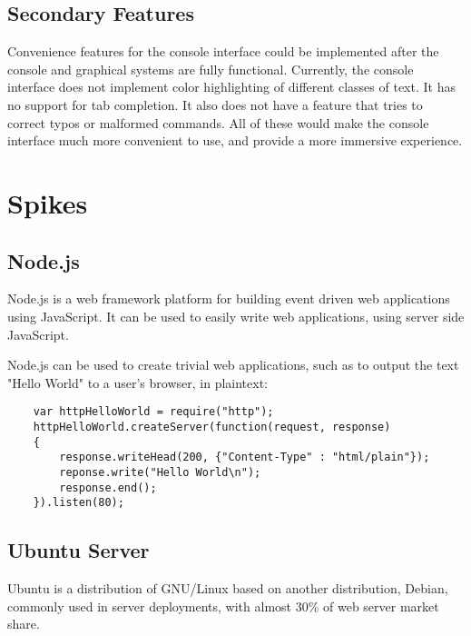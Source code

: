 \documentclass[12pt, letterpaper]{report}
\begin{document}
	\section{Secondary Features}
	Convenience features for the console interface could be implemented after the console and graphical systems are fully functional. Currently, the console interface does not implement color highlighting of different classes of text. It has no support for tab completion. It also does not have a feature that tries to correct typos or malformed commands. All of these would make the console interface much more convenient to use, and provide a more immersive experience.
	
	
	\chapter{Spikes}
	\section{Node.js}
	

	
	\par
	Node.js is a web framework platform for building event driven web applications using JavaScript. It can be used to easily write web applications, using server side JavaScript.
    	
	\par
    Node.js can be used to create trivial web applications, such as to output the text "Hello World" to a user's browser, in plaintext:
    
    \begin{lstlisting}
    var httpHelloWorld = require("http");
    httpHelloWorld.createServer(function(request, response)
    {
        response.writeHead(200, {"Content-Type" : "html/plain"});
        reponse.write("Hello World\n");
        response.end();
    }).listen(80);
    \end{lstlisting}
    
    
	\section{Ubuntu Server}
	\par
	Ubuntu is a distribution of GNU/Linux based on another distribution, Debian, commonly used in server deployments, with almost 30\% of web server market share.
	
\end{document}
